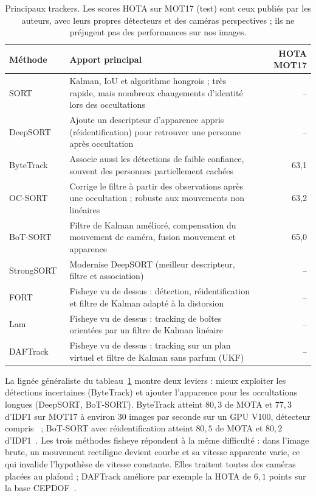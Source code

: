 \documentclass[11pt,a4paper]{article}
\begin{document}
\begin{table}[H]
\centering\small
\begin{tabularx}{\linewidth}{lXr}
\toprule
Méthode & Apport principal & HOTA MOT17\\
\midrule
SORT~\cite{bewley2016} & Kalman, IoU et algorithme hongrois ; très rapide, mais nombreux changements d'identité lors des occultations & --\\
DeepSORT~\cite{wojke2017} & Ajoute un descripteur d'apparence appris (réidentification) pour retrouver une personne après occultation & --\\
ByteTrack~\cite{zhang2022bytetrack} & Associe aussi les détections de faible confiance, souvent des personnes partiellement cachées & 63,1\\
OC-SORT~\cite{cao2023} & Corrige le filtre à partir des observations après une occultation ; robuste aux mouvements non linéaires & 63,2\\
BoT-SORT~\cite{aharon2022} & Filtre de Kalman amélioré, compensation du mouvement de caméra, fusion mouvement et apparence & 65,0\\
StrongSORT~\cite{du2022} & Modernise DeepSORT (meilleur descripteur, filtre et association) & --\\
\midrule
FORT~\cite{odic2023fort} & Fisheye vu de dessus : détection, réidentification et filtre de Kalman adapté à la distorsion & --\\
Lam~\cite{lam2024} & Fisheye vu de dessus : tracking de boîtes orientées par un filtre de Kalman linéaire & --\\
DAFTrack~\cite{vanasirikul2025} & Fisheye vu de dessus : tracking sur un plan virtuel et filtre de Kalman sans parfum (UKF) & --\\
\bottomrule
\end{tabularx}
\caption{Principaux trackers. Les scores HOTA sur MOT17 (test) sont ceux publiés par les auteurs, avec leurs propres détecteurs et des caméras perspectives ; ils ne préjugent pas des performances sur nos images.}
\label{tab:suiveurs}
\end{table}

La lignée généraliste du tableau~\ref{tab:suiveurs} montre deux leviers : mieux exploiter les détections incertaines (ByteTrack) et ajouter l'apparence pour les occultations longues (DeepSORT, BoT-SORT). ByteTrack atteint $80{,}3$ de MOTA et $77{,}3$ d'IDF1 sur MOT17 à environ 30 images par seconde sur un GPU V100, détecteur compris~\cite{zhang2022bytetrack} ; BoT-SORT avec réidentification atteint $80{,}5$ de MOTA et $80{,}2$ d'IDF1~\cite{aharon2022}. Les trois méthodes fisheye répondent à la même difficulté : dans l'image brute, un mouvement rectiligne devient courbe et sa vitesse apparente varie, ce qui invalide l'hypothèse de vitesse constante. Elles traitent toutes des caméras placées au plafond ; DAFTrack améliore par exemple la HOTA de $6{,}1$ points sur la base CEPDOF~\cite{vanasirikul2025}.
\end{document}
